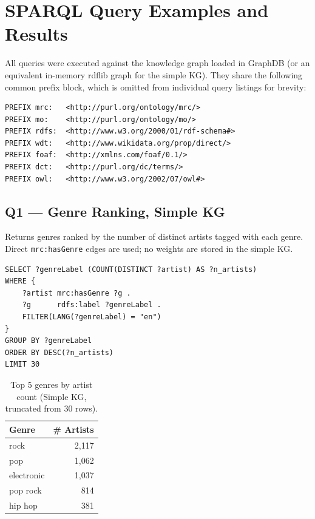 \clearpage
\section{SPARQL Query Examples and Results}
\label{sec:sparql_examples}

All queries were executed against the knowledge graph loaded in GraphDB (or an equivalent in-memory rdflib graph for the simple KG). They share the following common prefix block, which is omitted from individual query listings for brevity:

\begin{footnotesize}
\begin{verbatim}
PREFIX mrc:   <http://purl.org/ontology/mrc/>
PREFIX mo:    <http://purl.org/ontology/mo/>
PREFIX rdfs:  <http://www.w3.org/2000/01/rdf-schema#>
PREFIX wdt:   <http://www.wikidata.org/prop/direct/>
PREFIX foaf:  <http://xmlns.com/foaf/0.1/>
PREFIX dct:   <http://purl.org/dc/terms/>
PREFIX owl:   <http://www.w3.org/2002/07/owl#>
\end{verbatim}
\end{footnotesize}

\subsection*{Q1 — Genre Ranking, Simple KG}

Returns genres ranked by the number of distinct artists tagged with each genre. Direct \texttt{mrc:hasGenre} edges are used; no weights are stored in the simple KG.

\begin{footnotesize}
\begin{verbatim}
SELECT ?genreLabel (COUNT(DISTINCT ?artist) AS ?n_artists)
WHERE {
    ?artist mrc:hasGenre ?g .
    ?g      rdfs:label ?genreLabel .
    FILTER(LANG(?genreLabel) = "en")
}
GROUP BY ?genreLabel
ORDER BY DESC(?n_artists)
LIMIT 30
\end{verbatim}
\end{footnotesize}

\begin{table}[H]
\centering\footnotesize
\caption{Top 5 genres by artist count (Simple KG, truncated from 30 rows).}
\begin{tabular}{lr}
\toprule
Genre & \# Artists \\ \midrule
rock       & 2{,}117 \\
pop        & 1{,}062 \\
electronic & 1{,}037 \\
pop rock   &   814 \\
hip hop    &   381 \\
\bottomrule
\end{tabular}
\end{table}

